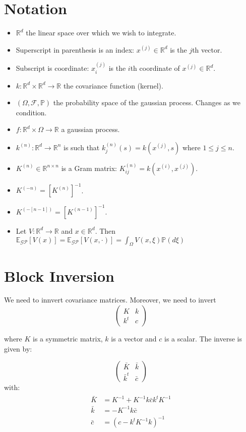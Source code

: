 \documentclass[paper=a4, fontsize=11pt]{scrartcl} %
\numberwithin{equation}{section} %
\numberwithin{figure}{section} %
\numberwithin{table}{section} %
\newcommand{\rr}{\mathbb{R}}
\newcommand{\egp}{\mathbb{E}_{\mathcal{GP}}}
\newcommand{\xii}{x^{(i)}}
\newcommand{\xj}{x^{(j)}}
\newcommand{\kn}{k^{(n)}}
\newcommand{\Kinvn}{K^{(-n)}} %
\newcommand{\Kinvnm}{K^{(-[n-1])}}
\newcommand{\kinv}{K^{-1}} %
\begin{document}
\section{Notation}
\begin{itemize}
 \item $\rr^d$ the linear space over which we wish to integrate.
 \item Superscript in parenthesis is an index: $\xj \in \rr^d$ is the $j$th vector.
 \item Subscript is coordinate: $\xj_i$ is the $i$th coordinate of $\xj \in \rr^d$.
 \item $k: \rr ^d \times \rr ^d \to \rr$ the covariance function (kernel).
 \item $(\Omega, \mathcal{F}, \mathbb{P})$ the probability space of the gaussian process. Changes as we condition.
 \item $f : \rr^d \times \Omega \to \rr$ a gaussian process.
 \item $\kn: \rr^d \to \rr^n$ is such that $\kn_j(s) = k(\xj , s)$ where $1 \leq j \leq n$. 
 \item $K^{(n)} \in \rr^{ n\times n} $ is a Gram matrix: $K^{(n)}_{ij} = k(\xii , \xj)$.
 \item $\Kinvn = [K^{(n)}]^{-1}$.
 \item $\Kinvnm = [K^{(n-1)}]^{-1}$.
 \item Let $V: \rr^d \to \rr$ and $x \in \rr^d$. Then $\egp[ V(x) ]=\egp [V(x, \cdot)] =  \int_{\Omega} V(x, \xi) \mathbb{P}(d\xi) $
\end{itemize}


\section{Block Inversion}
We need to innvert covariance matrices. Moreover, we need to invert
$$ \left( \begin{array}{cc}
K   & k \\
k^t & c \end{array} \right)
$$

where $K$ is a symmetric matrix, $k$ is a vector and $c$ is a scalar.
The inverse is given by:

$$ \left( \begin{array}{cc}
\bar{K}   &  \bar{k} \\
\bar{k}^t   &  \bar{c} \end{array} \right)
$$
with:
\begin{align}
 \begin{split}
\bar{K} &=  \kinv + K^{-1}k\bar{c}k^t\kinv\\
\bar{k} &=  -\kinv k\bar{c}\\
\bar{c} &= (c - k^t\kinv k)^{-1} 
 \end{split}
\end{align}
\end{document}

